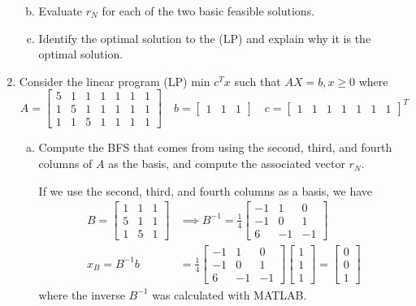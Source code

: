 \documentclass{article}
\begin{document}
\begin{enumerate}
\begin{enumerate}[a)]
\begin{soln}
				\end{soln}

			\item Evaluate $r_N$ for each of the two basic feasible solutions.

			\item Identify the optimal solution to the (LP) and explain why it is the optimal solution.
				
		\end{enumerate}

	\item Consider the linear program (LP) min $c^T x$ such that $AX=b, x\ge 0$ where \[A=\begin{bmatrix}
				5 & 1 & 1 & 1 & 1 & 1 & 1 \\
				1 & 5 & 1 & 1 & 1 & 1 & 1 \\
				1 & 1 & 5 & 1 & 1 & 1 & 1
			\end{bmatrix}\quad b=\begin{bmatrix}
				1 & 1 & 1
			\end{bmatrix}\quad c=\begin{bmatrix}
				1 & 1 & 1 & 1 & 1 & 1 & 1
		\end{bmatrix}^T\]

		\begin{enumerate}[a)]
			\item Compute the BFS that comes from using the second, third, and fourth columns of $A$ as the basis, and compute the associated vector $r_N.$
				\begin{soln}
					If we use the second, third, and fourth columns as a basis, we have 
					\begin{align*}
						B=\begin{bmatrix}
							1 & 1 & 1 \\
							5 & 1 & 1 \\
							1 & 5 & 1
						\end{bmatrix}&\implies B^{-1} = \frac{1}{4}\begin{bmatrix}
							-1 & 1 & 0 \\
							-1 & 0 & 1 \\
							6 & -1 & -1
						\end{bmatrix} \\
						x_B = B^{-1}b &= \frac{1}{4}\begin{bmatrix}
							-1 & 1 & 0 \\
							-1 & 0 & 1 \\
							6 & -1 & -1
						\end{bmatrix} \begin{bmatrix}
							1 \\ 1 \\ 1
						\end{bmatrix} = \begin{bmatrix}
							0 \\ 0 \\ 1
						\end{bmatrix}
					\end{align*} where the inverse $B^{-1}$ was calculated with MATLAB. 


\end{soln}
\end{enumerate}
\end{enumerate}
\end{document}

